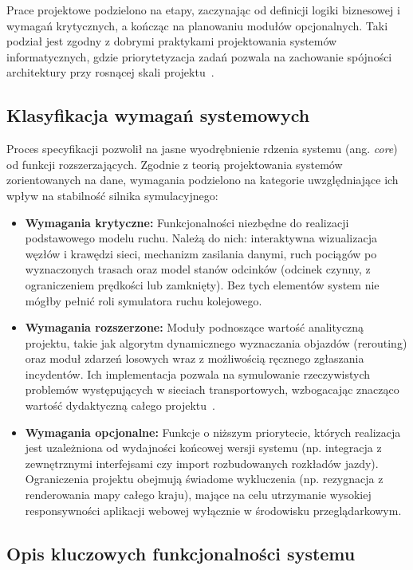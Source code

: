 \documentclass[twoside]{projektInzynierskiMS1z}
\begin{document}
Prace projektowe podzielono na etapy, zaczynając od definicji logiki biznesowej
i wymagań krytycznych, a kończąc na planowaniu modułów opcjonalnych. Taki podział
jest zgodny z dobrymi praktykami projektowania systemów informatycznych, gdzie
priorytetyzacja zadań pozwala na zachowanie spójności architektury przy rosnącej
skali projektu~\cite{martin2017clean}.

\subsection{Klasyfikacja wymagań systemowych}

Proces specyfikacji pozwolił na jasne wyodrębnienie rdzenia systemu (ang. \emph{core})
od funkcji rozszerzających. Zgodnie z teorią projektowania systemów zorientowanych na
dane, wymagania podzielono na kategorie uwzględniające ich wpływ na stabilność silnika
symulacyjnego:

\begin{itemize}
\item \textbf{Wymagania krytyczne:} Funkcjonalności niezbędne do realizacji
podstawowego modelu ruchu. Należą do nich: interaktywna wizualizacja węzłów
i krawędzi sieci, mechanizm zasilania danymi, ruch pociągów po wyznaczonych
trasach oraz model stanów odcinków (odcinek czynny, z ograniczeniem prędkości
lub zamknięty). Bez tych elementów system nie mógłby pełnić roli symulatora
ruchu kolejowego.

\item \textbf{Wymagania rozszerzone:} Moduły podnoszące wartość analityczną projektu,
takie jak algorytm dynamicznego wyznaczania objazdów (rerouting) oraz moduł zdarzeń losowych wraz z możliwością ręcznego zgłaszania incydentów. Ich implementacja pozwala na symulowanie rzeczywistych problemów występujących w sieciach transportowych,
wzbogacając znacząco wartość dydaktyczną całego projektu~\cite{sommerville2016}.

\item \textbf{Wymagania opcjonalne:} Funkcje o niższym priorytecie, których realizacja
jest uzależniona od wydajności końcowej wersji systemu (np. integracja z zewnętrznymi
interfejsami czy import rozbudowanych rozkładów jazdy). Ograniczenia projektu obejmują
świadome wykluczenia (np. rezygnacja z renderowania mapy całego kraju), mające na celu
utrzymanie wysokiej responsywności aplikacji webowej wyłącznie w środowisku przeglądarkowym.
\end{itemize}

\subsection{Opis kluczowych funkcjonalności systemu}
\end{document}
